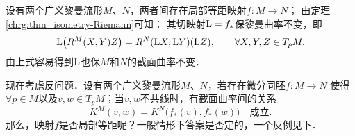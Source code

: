 设有两个广义黎曼流形$M$、$N$，两者间存在局部等距映射$f:M\to N$；
由定理\ref{chrg:thm_isometry-Riemann}可知：
其切映射${\rm L}=f_*$保黎曼曲率不变，即
\begin{equation}\label{chhss:eqn_LR}
    {\rm L} \bigl(R^M(X,Y)Z \bigr) = R^N({\rm L}X,{\rm L}Y)({\rm L}Z),
    \qquad \forall X,Y,Z \in T_p M .
\end{equation}
由上式容易得到${\rm L}$也保$M$和$N$的截面曲率不变．

现在考虑反问题．设有两个广义黎曼流形$M$、$N$，若存在微分同胚$f:M\to N$
使得$\forall p\in M$以及$v,w\in T_p M$；当$v,w$不共线时，有截面曲率间的关系
\begin{equation}
    K^M(v,w)=K^N\bigl(f_*(v), f_*(w)\bigr)\quad \text{成立}.
\end{equation}
那么，映射$f$是否局部等距呢？一般情形下答案是否定的，一个反例见下．





